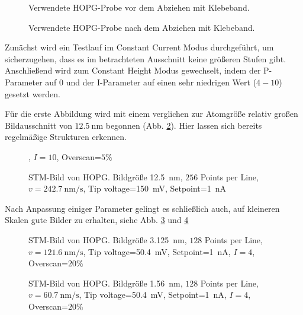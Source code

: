 \documentclass{article}
\begin{document}
\begin{figure}[h]
    \centering
    \begin{minipage}{0.52\textwidth}
        \centering
        \caption{Verwendete HOPG-Probe vor dem Abziehen mit Klebeband.}
        \label{fig:hopg-raw-lupe}
    \end{minipage}
    \hfill
    \begin{minipage}{0.46\textwidth}
        \centering
        \caption{Verwendete HOPG-Probe nach dem Abziehen mit Klebeband.}
        \label{fig:hopg-nach-lupe}
    \end{minipage}
\end{figure}

Zunächst wird ein Testlauf im Constant Current Modus durchgeführt, um sicherzugehen, dass
es im betrachteten Ausschnitt keine größeren Stufen gibt.
Anschließend wird zum Constant Height Modus gewechselt, indem der P-Parameter auf $0$ und der
I-Parameter auf einen sehr niedrigen Wert ($4 - 10$) gesetzt werden.

Für die erste Abbildung wird mit einem verglichen zur Atomgröße relativ großen Bildausschnitt von $\SI{12.5}{\nm}$ begonnen (Abb. \ref{fig:hopg-large}). Hier lassen sich bereits regelmäßige Strukturen erkennen.
\begin{figure}
    \centering
    \caption{STM-Bild von HOPG. Bildgröße \SI{12.5}{\nm}, $256$ Points per Line,
    $v=\SI{242.7}{\nm\per\s}$, Tip voltage=\SI{150}{\mV}, Setpoint=\SI{1}{\nA}}, $I=10$, Overscan=$5\%$
    \label{fig:hopg-large}
\end{figure}

Nach Anpassung einiger Parameter gelingt es schließlich auch, auf kleineren Skalen gute Bilder zu erhalten, siehe Abb. \ref{fig:hopg-medium} und \ref{fig:hopg-small}
\begin{figure}
    \centering
    \caption{
        STM-Bild von HOPG. Bildgröße \SI{3.125}{\nm}, $128$ Points per Line,
        $v=\SI{121.6}{\nm\per\s}$, Tip voltage=\SI{50.4}{\mV}, Setpoint=\SI{1}{\nA}, $I=4$, Overscan=$20\%$
    }
    \label{fig:hopg-medium}
\end{figure}

\begin{figure}
    \centering
    \caption{
        STM-Bild von HOPG. Bildgröße \SI{1.56}{\nm}, $128$ Points per Line,
        $v=\SI{60.7}{\nm\per\s}$, Tip voltage=\SI{50.4}{\mV}, Setpoint=\SI{1}{\nA}, $I=4$, Overscan=$20\%$
    }
    \label{fig:hopg-small}
\end{figure}
\end{document}
